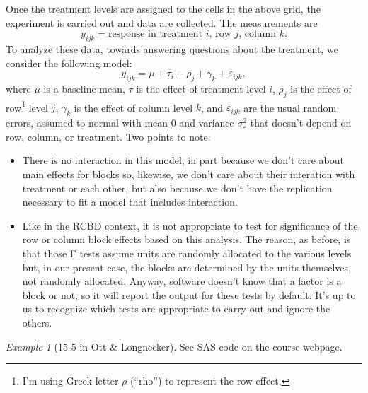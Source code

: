 \documentclass[a4paper, 12pt]{article}
\theoremstyle{plain}
\theoremstyle{definition}
\theoremstyle{remark}
\newtheorem*{example}{Example}
\newcommand{\eps}{\varepsilon}
\begin{document}
Once the treatment levels are assigned to the cells in the above grid, the experiment is carried out and data are collected.  The measurements are 
\[ y_{ijk} = \text{response in treatment $i$, row $j$, column $k$}. \]
To analyze these data, towards answering questions about the treatment, we consider the following model:
\[ y_{ijk} = \mu + \tau_i + \rho_j + \gamma_k + \eps_{ijk}, \]
where $\mu$ is a baseline mean, $\tau$ is the effect of treatment level $i$, $\rho_j$ is the effect of row\footnote{I'm using Greek letter $\rho$ (``rho'') to represent the row effect.} level $j$, $\gamma_k$ is the effect of column level $k$, and $\eps_{ijk}$ are the usual random errors, assumed to normal with mean 0 and variance $\sigma_\eps^2$ that doesn't depend on row, column, or treatment.  Two points to note:
\begin{itemize}
\item There is no interaction in this model, in part because we don't care about main effects for blocks so, likewise, we don't care about their interation with treatment or each other, but also because we don't have the replication necessary to fit a model that includes interaction.
\item Like in the RCBD context, it is not appropriate to test for significance of the row or column block effects based on this analysis.  The reason, as before, is that those F tests assume units are randomly allocated to the various levels but, in our present case, the blocks are determined by the units themselves, not randomly allocated.  Anyway, software doesn't know that a factor is a block or not, so it will report the output for these tests by default.  It's up to us to recognize which tests are appropriate to carry out and ignore the others.  
\end{itemize}

\begin{example}[15-5 in Ott \& Longnecker]
See SAS code on the course webpage.
\end{example}
\end{document}
